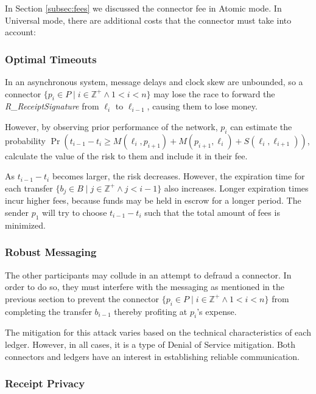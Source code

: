\documentclass[letterpaper,twocolumn,10pt]{article}
\begin{document}
In Section \ref{subsec:fees} we discussed the connector fee in Atomic mode. In Universal mode, there are additional costs that the connector must take into account:


\subsubsection{Optimal Timeouts}
\label{subsubsec:optimal-timeouts}

In an asynchronous system, message delays and clock skew are unbounded, so a connector $ \{ p_i \in P \mid i \in \mathbb{Z}^+ \land 1 < i < n \} $ may lose the race to forward the \textit{R\_ReceiptSignature} from $\ell_i$ to $\ell_{i-1}$, causing them to lose money.

However, by observing prior performance of the network, $p_i$ can estimate the probability $\Pr(t_{i-1} - t_i \geq M(\ell_i, p_{i+1}) + M(p_{i+1}, \ell_i) + S(\ell_i, \ell_{i+1}))$, calculate the value of the risk to them and include it in their fee.

As $t_{i-1} - t_i$ becomes larger, the risk decreases. However, the expiration time for each transfer $ \{ b_j \in B \mid j \in \mathbb{Z}^+ \land j < i-1 \} $ also increases. Longer expiration times incur higher fees, because funds may be held in escrow for a longer period. The sender $p_1$ will try to choose $t_{i-1} - t_i$ such that the total amount of fees is minimized.


\subsubsection{Robust Messaging}

The other participants may collude in an attempt to defraud a connector. In order to do so, they must interfere with the messaging as mentioned in the previous section to prevent the connector $ \{ p_i \in P \mid i \in \mathbb{Z}^+ \land 1 < i < n \} $ from completing the transfer $b_{i-1}$ thereby profiting at $p_i$'s expense.

The mitigation for this attack varies based on the technical characteristics of each ledger. However, in all cases, it is a type of Denial of Service mitigation. Both connectors and ledgers have an interest in establishing reliable communication.


\subsubsection{Receipt Privacy}
\end{document}
